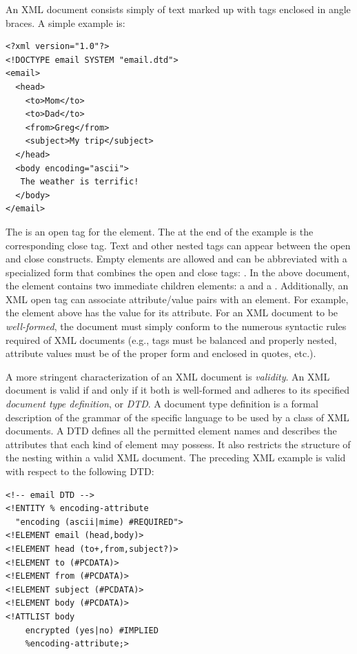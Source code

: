 \documentclass{article}
\begin{document}
\begin{multicols}{2}
An XML document consists simply of text marked up with tags enclosed in
angle braces.  A simple example is:

\begin{verbatim}
<?xml version="1.0"?>
<!DOCTYPE email SYSTEM "email.dtd">
<email>
  <head>
    <to>Mom</to>
    <to>Dad</to>
    <from>Greg</from>
    <subject>My trip</subject>
  </head>
  <body encoding="ascii">
   The weather is terrific!
  </body>
</email>
\end{verbatim}

The  is an open tag for the  element.
The  at the end of the example is the corresponding
close tag.  Text and other nested tags can appear between the open and
close constructs. Empty elements are allowed and can be abbreviated with
a specialized form that combines the open and close tags:
.  In the above document, the
 element contains two immediate children elements: a
 and a .  Additionally, an XML open tag
can associate attribute/value pairs with an element.  For example, the
 element above has the value  for its
 attribute.  For an XML document to be
\emph{well-formed}, the document must simply conform to the numerous
syntactic rules required of XML documents (e.g., tags must be balanced
and properly nested, attribute values must be of the proper form and
enclosed in quotes, etc.).

A more stringent characterization of an XML document is \emph{validity}.
An XML document is valid if and only if it both is well-formed and
adheres to its specified \emph{document type definition}, or \emph{DTD}.
A document type definition is a formal description of the grammar of the
specific language to be used by a class of XML documents.  A DTD defines
all the permitted element names and describes the attributes that each
kind of element may possess. It also restricts the structure of the
nesting within a valid XML document.  The preceding XML example is valid
with respect to the following DTD:

\begin{verbatim}
<!-- email DTD -->
<!ENTITY % encoding-attribute 
  "encoding (ascii|mime) #REQUIRED">
<!ELEMENT email (head,body)>
<!ELEMENT head (to+,from,subject?)>
<!ELEMENT to (#PCDATA)>
<!ELEMENT from (#PCDATA)>
<!ELEMENT subject (#PCDATA)>
<!ELEMENT body (#PCDATA)>
<!ATTLIST body
    encrypted (yes|no) #IMPLIED
    %encoding-attribute;>
\end{verbatim}


\end{multicols}
\end{document}
